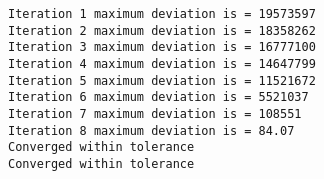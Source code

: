 \documentclass[
  letterpaper,
  DIV=11,
  numbers=noendperiod]{scrartcl}
\newenvironment{Shaded}{\begin{snugshade}}{\end{snugshade}}
\newcommand{\AttributeTok}[1]{\textcolor[rgb]{0.40,0.45,0.13}{#1}}
\newcommand{\DecValTok}[1]{\textcolor[rgb]{0.68,0.00,0.00}{#1}}
\newcommand{\FunctionTok}[1]{\textcolor[rgb]{0.28,0.35,0.67}{#1}}
\newcommand{\NormalTok}[1]{\textcolor[rgb]{0.00,0.23,0.31}{#1}}
\newcommand{\OtherTok}[1]{\textcolor[rgb]{0.00,0.23,0.31}{#1}}
\newcommand{\SpecialCharTok}[1]{\textcolor[rgb]{0.37,0.37,0.37}{#1}}
\newcommand{\StringTok}[1]{\textcolor[rgb]{0.13,0.47,0.30}{#1}}
\begin{document}
\begin{verbatim}
Iteration 1 maximum deviation is = 19573597 
Iteration 2 maximum deviation is = 18358262 
Iteration 3 maximum deviation is = 16777100 
Iteration 4 maximum deviation is = 14647799 
Iteration 5 maximum deviation is = 11521672 
Iteration 6 maximum deviation is = 5521037 
Iteration 7 maximum deviation is = 108551 
Iteration 8 maximum deviation is = 84.07 
Converged within tolerance 
Converged within tolerance 
\end{verbatim}

\begin{Shaded}
\end{Shaded}
\end{document}
